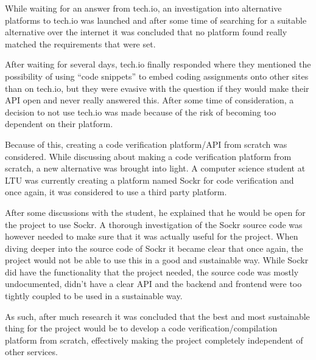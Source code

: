 \documentclass[a4paper,12pt]{article}
\begin{document}

While waiting for an answer from tech.io, an investigation into alternative platforms to tech.io was launched and after some time of searching for a suitable alternative over the internet it was concluded that no platform found really matched the requirements that were set.

After waiting for several days, tech.io finally responded where they mentioned the possibility of using ``code snippets'' to embed coding assignments onto other sites than on tech.io, but they were evasive with the question if they would make their API open and never really answered this. After some time of consideration, a decision to not use tech.io was made because of the risk of becoming too dependent on their platform.

Because of this, creating a code verification platform/API from scratch was considered. While discussing about making a code verification platform from scratch, a new alternative was brought into light. A computer science student at LTU was currently creating a platform named Sockr for code verification and once again, it was considered to use a third party platform.

After some discussions with the student, he explained that he would be open for the project to use Sockr. A thorough investigation of the Sockr source code was however needed to make sure that it was actually useful for the project. When diving deeper into the source code of Sockr it became clear that once again, the project would not be able to use this in a good and sustainable way. While Sockr did have the functionality that the project needed, the source code was mostly undocumented, didn't have a clear API and the backend and frontend were too tightly coupled to be used in a sustainable way.

As such, after much research it was concluded that the best and most sustainable thing for the project would be to develop a code verification/compilation platform from scratch, effectively making the project completely independent of other services.
\end{document}
